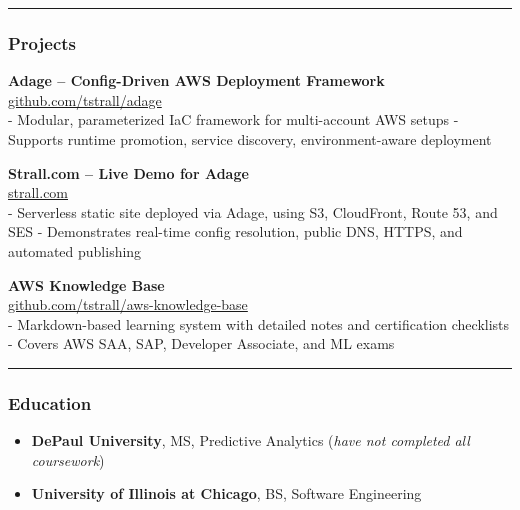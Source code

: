 \documentclass[11pt]{article}
\providecommand{\tightlist}{%
  \setlength{\itemsep}{0pt}\setlength{\parskip}{0pt}}
\begin{document}
\begin{center}\rule{0.5\linewidth}{0.5pt}\end{center}

\hypertarget{projects}{%
\subsubsection{Projects}\label{projects}}

\textbf{Adage -- Config-Driven AWS Deployment Framework}\\
\href{https://github.com/tstrall/adage}{github.com/tstrall/adage}\\
- Modular, parameterized IaC framework for multi-account AWS setups -
Supports runtime promotion, service discovery, environment-aware
deployment

\textbf{Strall.com -- Live Demo for Adage}\\
\href{https://strall.com}{strall.com}\\
- Serverless static site deployed via Adage, using S3, CloudFront, Route
53, and SES - Demonstrates real-time config resolution, public DNS,
HTTPS, and automated publishing

\textbf{AWS Knowledge Base}\\
\href{https://github.com/tstrall/aws-knowledge-base}{github.com/tstrall/aws-knowledge-base}\\
- Markdown-based learning system with detailed notes and certification
checklists - Covers AWS SAA, SAP, Developer Associate, and ML exams

\begin{center}\rule{0.5\linewidth}{0.5pt}\end{center}

\hypertarget{education}{%
\subsubsection{Education}\label{education}}

\begin{itemize}
\tightlist
\item
  \textbf{DePaul University}, MS, Predictive Analytics (\emph{have not
  completed all coursework})
\item
  \textbf{University of Illinois at Chicago}, BS, Software Engineering
\end{itemize}
\end{document}
